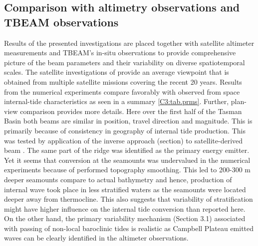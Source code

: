 \documentclass[12pt]{article}
\begin{document}
\subsection{Comparison with altimetry observations and TBEAM observations}
Results of the presented investigations are placed together with satellite altimeter measurements  
\citep{zhao2018satellite} and TBEAM's in-situ observations \citep{waterhouse2018observations} to 
provide comprehensive picture of the beam parameters and their variability on diverse 
spatiotemporal scales. The satellite investigations of \citep{zhao2018satellite} provide an average 
viewpoint that is obtained from multiple satellite missions covering the recent 20 years. Results 
from the numerical experiments compare favorably with observed from space internal-tide 
characteristics as seen in a summary \ref{C3:tab.prms}. Further, plan-view comparison 
 provides more details. Here over the first half of the Tasman Basin 
both beams are similar in position, 
travel direction and magnitude. This is primarily because of consistency in geography of internal 
tide production. This was tested by application of the inverse approach (section) to satellite-derived beam 
. The same part of 
the ridge was identified as the primary energy emitter. Yet it seems that conversion at the 
seamounts was undervalued in the numerical experiments because of performed topography smoothing. 
This led to 200-300 m deeper seamounts compare to actual bathymetry and hence, production of  
internal wave took place in less stratified waters as the seamounts were located deeper away from 
thermocline. This also suggests that variability of stratification might have higher influence on 
the internal tide conversion than reported here. On the other hand, the primary variability 
mechanism (Section 3.1) associated with passing of non-local baroclinic tides is realistic as 
Campbell Plateau emitted waves can be clearly identified in the altimeter observations.\\
\end{document}
